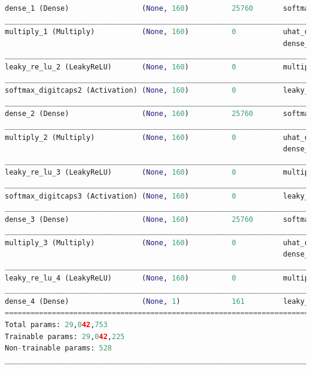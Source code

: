 \documentclass{vldb}
\begin{document}
\begin{lstlisting}[basicstyle=\scriptsize,language=Python]
dense_1 (Dense)                 (None, 160)          25760       softmax_digitcaps1[0][0]   
____________________________________________________________________________________________
multiply_1 (Multiply)           (None, 160)          0           uhat_digitcaps[0][0]       
                                                                 dense_1[0][0]              
____________________________________________________________________________________________
leaky_re_lu_2 (LeakyReLU)       (None, 160)          0           multiply_1[0][0]           
____________________________________________________________________________________________
softmax_digitcaps2 (Activation) (None, 160)          0           leaky_re_lu_2[0][0]        
____________________________________________________________________________________________
dense_2 (Dense)                 (None, 160)          25760       softmax_digitcaps2[0][0]   
____________________________________________________________________________________________
multiply_2 (Multiply)           (None, 160)          0           uhat_digitcaps[0][0]       
                                                                 dense_2[0][0]              
____________________________________________________________________________________________
leaky_re_lu_3 (LeakyReLU)       (None, 160)          0           multiply_2[0][0]           
____________________________________________________________________________________________
softmax_digitcaps3 (Activation) (None, 160)          0           leaky_re_lu_3[0][0]        
____________________________________________________________________________________________
dense_3 (Dense)                 (None, 160)          25760       softmax_digitcaps3[0][0]   
____________________________________________________________________________________________
multiply_3 (Multiply)           (None, 160)          0           uhat_digitcaps[0][0]       
                                                                 dense_3[0][0]              
____________________________________________________________________________________________
leaky_re_lu_4 (LeakyReLU)       (None, 160)          0           multiply_3[0][0]           
____________________________________________________________________________________________
dense_4 (Dense)                 (None, 1)            161         leaky_re_lu_4[0][0]        
============================================================================================
Total params: 29,042,753
Trainable params: 29,042,225
Non-trainable params: 528
____________________________________________________________________________________________
\end{lstlisting}
\end{document}
